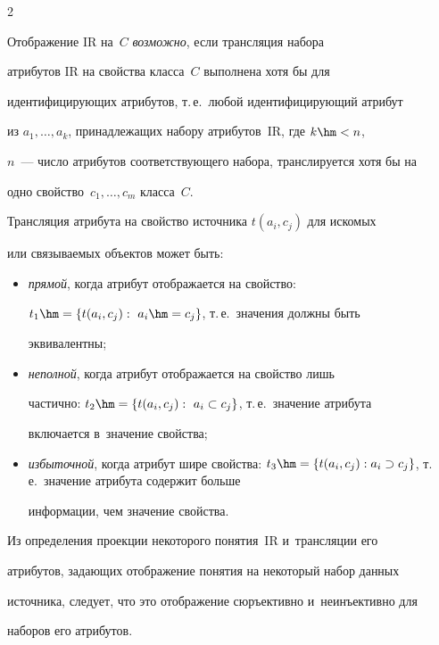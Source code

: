 \begin{multicols}{2}
    

    Отображение $\mathrm{IR}$ на~$C$ \textit{возможно}, если трансляция набора 

атрибутов $\mathrm{IR}$ на свойства класса~$C$ выполнена хотя бы для 

идентифицирующих атрибутов, т.\,е.\ любой идентифицирующий атрибут 

из $a_1, \ldots,  a_k$, принадлежащих набору атрибутов~$\mathrm{IR}$, где $k\hm< n$, 

$n$~--- число атрибутов соответствующего набора, транслируется хотя бы на 

одно свойство~$c_1, \ldots , c_m$ класса~$C$.

    

    Трансляция атрибута на свойство источника $t(a_i, c_j)$ для искомых 

или связываемых объектов может быть:

    \begin{itemize}

\item \textit{прямой}, когда атрибут отображается на свойство: 

$t_1\hm=\{t(a_i, c_j):\ a_i \hm= c_j\}$, т.\,е.\ значения должны быть 

эквивалентны;

\item \textit{неполной}, когда атрибут отображается на свойство лишь 

частично: $t_2\hm=\{t(a_i, c_j):\ a_i\subset c_j\}$, т.\,е.\ значение атрибута 

включается в~значение свойства;

\item \textit{избыточной}, когда атрибут шире свойства: $t_3\hm=\{t(a_i, 

c_j): a_i \supset c_j\}$, т.\,е.\ значение атрибута содержит больше 

информации, чем значение свойства.

\end{itemize}



    Из определения проекции некоторого понятия~$\mathrm{IR}$ и~трансляции его 

атрибутов, задающих отоб\-ра\-же\-ние понятия на некоторый набор данных 

источника, следует, что это отображение сюръективно и~неинъективно для 

наборов его атрибутов. 


\end{multicols}
